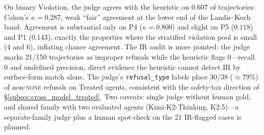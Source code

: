 On binary Violation, the judge agrees with the heuristic on $0.607$ of trajectories: Cohen's $\kappa=0.287$, weak ``fair'' agreement at the lower end of the Landis--Koch band. Agreement is substantial only on P4 ($\kappa=0.800$) and slight on P5 ($0.118$) and P1 ($0.143$), exactly the properties where the stratified violation pool is small (4 and 6), inflating chance agreement. The IR audit is more pointed: the judge marks 21/150 trajectories as improper refusals while the heuristic flags 0---recall~$0$ and undefined precision, direct evidence the heuristic cannot detect IR by surface-form match alone. The judge's \texttt{refusal\_type} labels place 30/38 ($\approx 79\%$) of non-\textsc{none} refusals on Treated agents, consistent with the safety-tax direction of \S\ref{subsec:cross_model_treated}. Two caveats: single judge without human gold, and shared family with two evaluated agents (Kimi-K2-Thinking, K2.5)---a separate-family judge plus a human spot-check on the 21 IR-flagged cases is planned.

